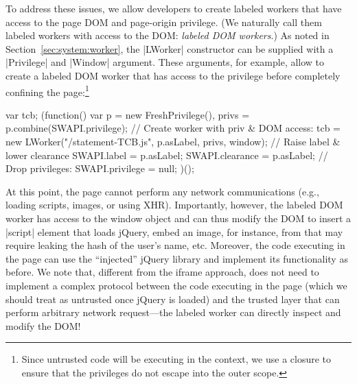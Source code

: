 To address these issues, we allow developers to create labeled workers that
have access to the page DOM and page-origin privilege.
%
(We naturally call them labeled workers with access to the DOM:
\emph{labeled DOM workers}.)
%
As noted in Section~\ref{sec:system:worker}, the \js|LWorker|
constructor can be supplied with a \js|Privilege| and \js|Window|
argument.
%
These arguments, for example, allow  to create a labeled DOM
worker that has access to the  privilege before completely
confining the page:\footnote{
  Since untrusted code will be executing in the context, we use a
  closure to ensure that the privileges do not escape into the outer
  scope.
}
\begin{jscode}
var tcb;
(function() {
  var p = new FreshPrivilege(),
      privs = p.combine(SWAPI.privilege);
  // Create worker with priv & DOM access:
  tcb = new LWorker("/statement-TCB.js",
                    p.asLabel, privs, window);
  // Raise label & lower clearance
  SWAPI.label = p.asLabel;
  SWAPI.clearance = p.asLabel;
  // Drop privileges:
  SWAPI.privilege = null;
})();
\end{jscode}
%
At this point, the page cannot perform any network communications
(e.g., loading scripts, images, or using XHR).
%
Importantly, however, the labeled DOM worker has access to the window
object and can thus modify the DOM to insert a \js|script| element
that loads jQuery, embed an image, for instance, from
 that may require leaking the hash of the user's
name, etc.
%
Moreover, the code executing in the page can use the ``injected''
jQuery library and implement its functionality as before.
%
We note that, different from the iframe approach,  does not 
need to implement a complex protocol between the code executing in the
page (which we should treat as untrusted once jQuery is loaded) and
the trusted layer that can perform arbitrary network request---the
labeled worker can directly inspect and modify the DOM!


